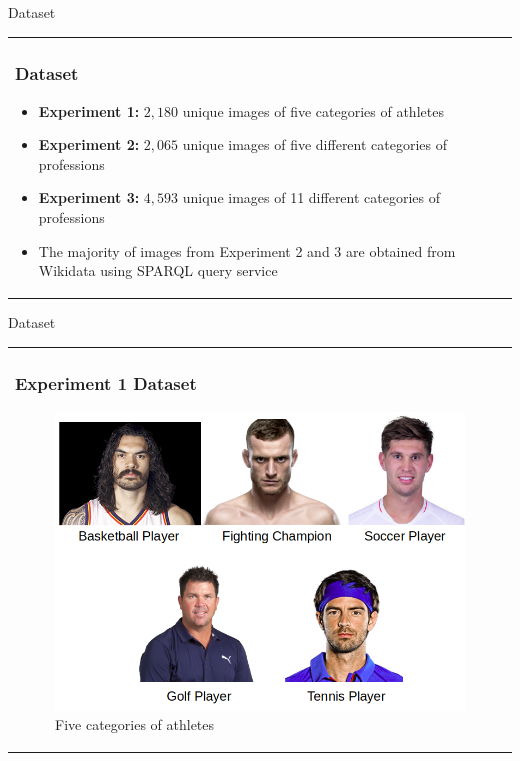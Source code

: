 \documentclass[11pt]{beamer}
\begin{document}
\begin{frame}{Dataset}
\begin{tabular}{l}
\parbox{1\linewidth}{
\frametitle{Dataset}
\begin{itemize}
\item \textbf{Experiment 1: } $2,180$ unique images of five categories of athletes
\item \textbf{Experiment 2: } $2,065$ unique images of five different categories of professions
\item \textbf{Experiment 3: } $4,593$ unique images of 11 different categories of professions
\item The majority of images from Experiment 2 and 3 are obtained from Wikidata using SPARQL query service
\end{itemize}
}
\end{tabular}  
\end{frame}

\begin{frame}{Dataset}
\begin{tabular}{l}
\parbox{1\linewidth}{
\frametitle{Experiment 1 Dataset}
\begin{figure}[!tbp]
 \centering
    \includegraphics[width=0.8\columnwidth]{figures/ex1.png}
    \caption{Five categories of athletes \cite{data1}}
	\label{fig:sport}
\end{figure}
}
\end{tabular}  
\end{frame}
\end{document}
